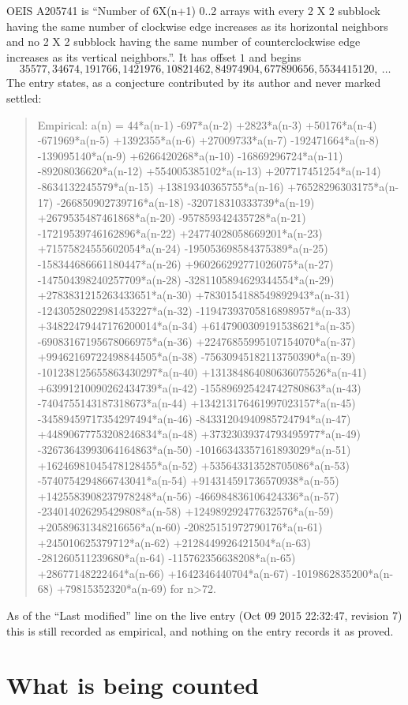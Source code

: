 \documentclass[11pt,a4paper]{article}
\theoremstyle{plain}
\theoremstyle{definition}
\begin{document}
OEIS A205741 is ``Number of 6X(n+1) 0..2 arrays with every 2 X 2 subblock having the same number of clockwise edge increases as its horizontal neighbors and no 2 X 2 subblock having the same number of counterclockwise edge increases as its vertical neighbors.''. It has offset $1$ and begins
\[
35577, 34674, 191766, 1421976, 10821462, 84974904, 677890656, 5534415120,\ \dots
\]
The entry states, as a conjecture contributed by its author and never marked settled:
\begin{quote}
Empirical: a(n) = 44*a(n-1) -697*a(n-2) +2823*a(n-3) +50176*a(n-4) -671969*a(n-5) +1392355*a(n-6) +27009733*a(n-7) -192471664*a(n-8) -139095140*a(n-9) +6266420268*a(n-10) -16869296724*a(n-11) -89208036620*a(n-12) +554005385102*a(n-13) +207717451254*a(n-14) -8634132245579*a(n-15) +13819340365755*a(n-16) +76528296303175*a(n-17) -266850902739716*a(n-18) -320718310333739*a(n-19) +2679535487461868*a(n-20) -957859342435728*a(n-21) -17219539746162896*a(n-22) +24774028058669201*a(n-23) +71575824555602054*a(n-24) -195053698584375389*a(n-25) -158344686661180447*a(n-26) +960266292771026075*a(n-27) -147504398240257709*a(n-28) -3281105894629344554*a(n-29) +2783831215263433651*a(n-30) +7830154188549892943*a(n-31) -12430528022981453227*a(n-32) -11947393705816898957*a(n-33) +34822479447176200014*a(n-34) +6147900309191538621*a(n-35) -69083167195678066975*a(n-36) +22476855995107154070*a(n-37) +99462169722498844505*a(n-38) -75630945182113750390*a(n-39) -101238125655863430297*a(n-40) +131384864080636075526*a(n-41) +63991210090262434739*a(n-42) -155896925424742780863*a(n-43) -7404755143187318673*a(n-44) +134213176461997023157*a(n-45) -34589459717354297494*a(n-46) -84331204940985724794*a(n-47) +44890677753208246834*a(n-48) +37323039374793495977*a(n-49) -32673643993064164863*a(n-50) -10166343357161893029*a(n-51) +16246981045478128455*a(n-52) +535643313528705086*a(n-53) -5740754294866743041*a(n-54) +914314591736570938*a(n-55) +1425583908237978248*a(n-56) -466984836106424336*a(n-57) -234014026295429808*a(n-58) +124989292477632576*a(n-59) +20589631348216656*a(n-60) -20825151972790176*a(n-61) +245010625379712*a(n-62) +2128449926421504*a(n-63) -281260511239680*a(n-64) -115762356638208*a(n-65) +28677148222464*a(n-66) +1642346440704*a(n-67) -1019862835200*a(n-68) +79815352320*a(n-69) for n>72.
\end{quote}
As of the ``Last modified'' line on the live entry (Oct 09 2015 22:32:47, revision 7) this is still
recorded as empirical, and nothing on the entry records it as proved.

\section{What is being counted}
\end{document}
